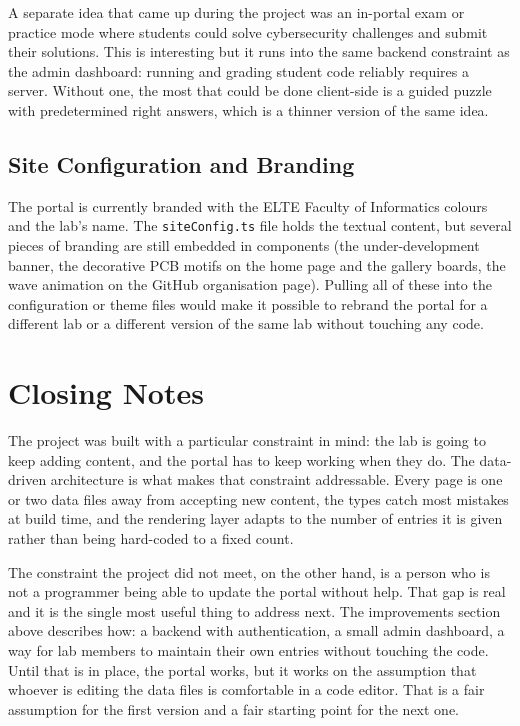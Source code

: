 A separate idea that came up during the project was an in-portal exam or practice mode where students could solve cybersecurity challenges and submit their solutions. This is interesting but it runs into the same backend constraint as the admin dashboard: running and grading student code reliably requires a server. Without one, the most that could be done client-side is a guided puzzle with predetermined right answers, which is a thinner version of the same idea.

\subsection{Site Configuration and Branding}\label{subsec:challenges-branding}

The portal is currently branded with the ELTE Faculty of Informatics colours and the lab's name. The \texttt{siteConfig.ts} file holds the textual content, but several pieces of branding are still embedded in components (the under-development banner, the decorative PCB motifs on the home page and the gallery boards, the wave animation on the GitHub organisation page). Pulling all of these into the configuration or theme files would make it possible to rebrand the portal for a different lab or a different version of the same lab without touching any code.

\section{Closing Notes}\label{sec:challenges-closing}

The project was built with a particular constraint in mind: the lab is going to keep adding content, and the portal has to keep working when they do. The data-driven architecture is what makes that constraint addressable. Every page is one or two data files away from accepting new content, the types catch most mistakes at build time, and the rendering layer adapts to the number of entries it is given rather than being hard-coded to a fixed count.

The constraint the project did not meet, on the other hand, is a person who is not a programmer being able to update the portal without help. That gap is real and it is the single most useful thing to address next. The improvements section above describes how: a backend with authentication, a small admin dashboard, a way for lab members to maintain their own entries without touching the code. Until that is in place, the portal works, but it works on the assumption that whoever is editing the data files is comfortable in a code editor. That is a fair assumption for the first version and a fair starting point for the next one.
